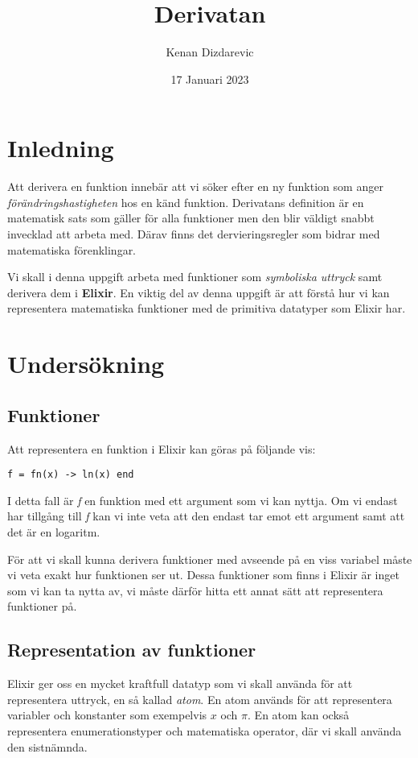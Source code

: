 \documentclass[a4paper,11pt]{article}
\begin{document}
\title{
    \textbf{Derivatan}
}
\author{Kenan Dizdarevic}
\date{17 Januari 2023}

\maketitle

\section*{Inledning}
Att derivera en funktion innebär att vi söker efter en ny funktion som anger \emph{förändringshastigheten} hos en känd funktion. Derivatans definition är en matematisk sats som gäller för alla funktioner men den blir väldigt snabbt invecklad att arbeta med. Därav finns det dervieringsregler som bidrar med matematiska förenklingar.

Vi skall i denna uppgift arbeta med funktioner som \emph{symboliska uttryck} samt derivera dem i \textbf{Elixir}. En viktig del av denna uppgift är att förstå hur vi kan representera matematiska funktioner med de primitiva datatyper som Elixir har.    

\section*{Undersökning}

\subsection*{Funktioner}
Att representera en funktion i Elixir kan göras på följande vis:
\begin{verbatim}
f = fn(x) -> ln(x) end
\end{verbatim}
I detta fall är \emph{f} en funktion med ett argument som vi kan nyttja. Om vi endast har tillgång till \emph{f} kan vi inte veta att den endast tar emot ett argument samt att det är en logaritm. 

För att vi skall kunna derivera funktioner med avseende på en viss variabel måste vi veta exakt hur funktionen ser ut. Dessa funktioner som finns i Elixir är inget som vi kan ta nytta av, vi måste därför hitta ett annat sätt att representera funktioner på.
\subsection*{Representation av funktioner}
Elixir ger oss en mycket kraftfull datatyp som vi skall använda för att representera uttryck, en så kallad \emph{atom}. En atom används för att representera variabler och konstanter som exempelvis $x$ och $\pi$. En atom kan också representera enumerationstyper och matematiska operator, där vi skall använda den sistnämnda.  
\end{document}
